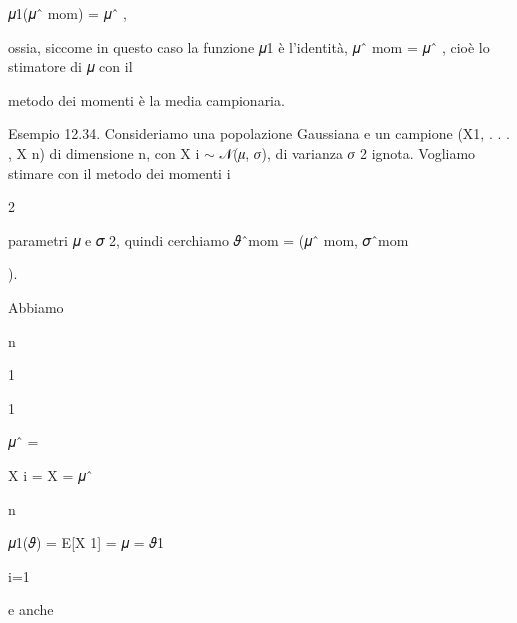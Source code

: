 \documentclass[a4paper,portrait,12pt]{article}
\begin{document}
\begin{flushleft}
𝜇1(𝜇ˆ mom) = 𝜇ˆ ,
\end{flushleft}


\begin{flushleft}
ossia, siccome in questo caso la funzione 𝜇1 \`{e} l'identit\`{a}, 𝜇ˆ mom = 𝜇ˆ , cio\`{e} lo stimatore di 𝜇 con il
\end{flushleft}


\begin{flushleft}
metodo dei momenti \`{e} la media campionaria.
\end{flushleft}


\begin{flushleft}
Esempio 12.34. Consideriamo una popolazione Gaussiana e un campione (X1, . . . , X n) di dimensione n, con X i $\sim$ 𝒩(𝜇, 𝜎), di varianza 𝜎 2 ignota. Vogliamo stimare con il metodo dei momenti i
\end{flushleft}


2


\begin{flushleft}
parametri 𝜇 e 𝜎 2, quindi cerchiamo 𝜗ˆmom = (𝜇ˆ mom, 𝜎ˆmom
\end{flushleft}


).


\begin{flushleft}
Abbiamo
\end{flushleft}


\begin{flushleft}
n
\end{flushleft}


1


1


\begin{flushleft}
𝜇ˆ =
\end{flushleft}


\begin{flushleft}
X i = X = 𝜇ˆ
\end{flushleft}


\begin{flushleft}
n
\end{flushleft}


\begin{flushleft}
𝜇1(𝜗) = E[X 1] = 𝜇 = 𝜗1
\end{flushleft}


\begin{flushleft}
i=1
\end{flushleft}


\begin{flushleft}
e anche
\end{flushleft}
\end{document}

